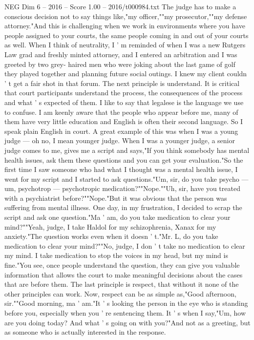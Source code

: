 \begin{textsample}{NEG Dim 6 – 2016 – Score 1.00 – 2016/t000984.txt}
The judge has to make a conscious decision not to say things like,"my officer,""my prosecutor,""my defense attorney."And this is challenging when we work in environments where you have people assigned to your courts, the same people coming in and out of your courts as well.
When I think of neutrality, I ' m reminded of when I was a new Rutgers Law grad and freshly minted attorney, and I entered an arbitration and I was greeted by two grey- haired men who were joking about the last game of golf they played together and planning future social outings.
I knew my client couldn ' t get a fair shot in that forum.
The next principle is understand.
It is critical that court participants understand the process, the consequences of the process and what ' s expected of them.
I like to say that legalese is the language we use to confuse.
I am keenly aware that the people who appear before me, many of them have very little education and English is often their second language.
So I speak plain English in court.
A great example of this was when I was a young judge — oh no, I mean younger judge.
When I was a younger judge, a senior judge comes to me, gives me a script and says,"If you think somebody has mental health issues, ask them these questions and you can get your evaluation."So the first time I saw someone who had what I thought was a mental health issue, I went for my script and I started to ask questions."Um, sir, do you take psycho — um, psychotrop — psychotropic medication?""Nope.""Uh, sir, have you treated with a psychiatrist before?""Nope."But it was obvious that the person was suffering from mental illness.
One day, in my frustration, I decided to scrap the script and ask one question."Ma ' am, do you take medication to clear your mind?""Yeah, judge, I take Haldol for my schizophrenia, Xanax for my anxiety."The question works even when it doesn ' t."Mr.
L, do you take medication to clear your mind?""No, judge, I don ' t take no medication to clear my mind.
I take medication to stop the voices in my head, but my mind is fine."You see, once people understand the question, they can give you valuable information that allows the court to make meaningful decisions about the cases that are before them.
The last principle is respect, that without it none of the other principles can work.
Now, respect can be as simple as,"Good afternoon, sir.""Good morning, ma ' am."It ' s looking the person in the eye who is standing before you, especially when you ' re sentencing them.
It ' s when I say,"Um, how are you doing today?
And what ' s going on with you?"And not as a greeting, but as someone who is actually interested in the response.

\end{textsample}
